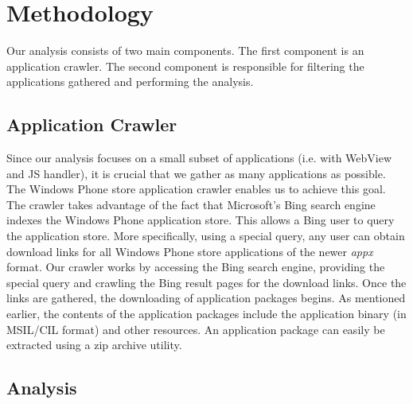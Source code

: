 \documentclass[conference]{IEEEtran}
\begin{document}
\section{Methodology}

Our analysis consists of two main components.
The first component is an application crawler.
The second component is responsible for filtering the applications gathered and performing the analysis.

\subsection{Application Crawler}

Since our analysis focuses on a small subset of applications (i.e. with WebView and JS handler), it is crucial that we gather as many applications as possible.
The Windows Phone store application crawler enables us to achieve this goal.
The crawler takes advantage of the fact that Microsoft's Bing search engine indexes the Windows Phone application store.
This allows a Bing user to query the application store.
More specifically, using a special query, any user can obtain download links for all Windows Phone store applications of the newer \textit{appx} format.
Our crawler works by accessing the Bing search engine, providing the special query and crawling the Bing result pages for the download links.
Once the links are gathered, the downloading of application packages begins.
As mentioned earlier, the contents of the application packages include the application binary (in MSIL/CIL format) and other resources.
An application package can easily be extracted using a zip archive utility.

\subsection{Analysis}
\end{document}
